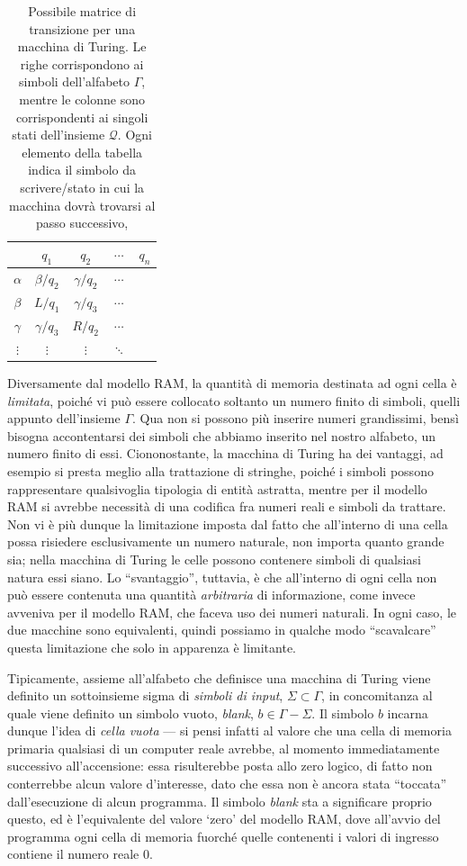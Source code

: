 \documentclass[10pt]{\classname}
\begin{document}
\begin{table}[ht]
\centering
\begin{tabular}{c|cccc}
    & $q_1$ & $q_2$ & $\cdots$ & $q_n$ \\
    \hline
$\alpha$ & $\beta/q_2$ & $\gamma/q_2$ & $\cdots$ & \\
$\beta$ & $L/q_1$ & $\gamma/q_3$ & $\cdots$ & \\
$\gamma$ & $\gamma/q_3$ & $R/q_2$ & $\cdots$ & \\
$\vdots$ & $\vdots$ & $\vdots$ & $\ddots$ &    
\end{tabular}
\caption{Possibile matrice di transizione per una macchina di Turing. Le righe
corrispondono ai simboli dell'alfabeto $\Gamma$, mentre le colonne sono
corrispondenti ai singoli stati dell'insieme $\mathcal
Q$. Ogni elemento della tabella indica il simbolo da scrivere/stato in cui la
macchina dovrà trovarsi al passo successivo,}\label{tab:matriceTransizione}
\end{table}
\bigskip


Diversamente dal modello RAM, la quantità di memoria destinata ad ogni cella è
\emph{limitata}, poiché vi può essere collocato soltanto un numero finito di
simboli, quelli appunto dell'insieme $\Gamma$. Qua non si possono più inserire
numeri grandissimi, bensì bisogna accontentarsi dei simboli che abbiamo inserito
nel nostro alfabeto, un numero finito di essi. Ciononostante, la macchina di
Turing ha dei vantaggi, ad esempio si presta meglio alla trattazione di
stringhe, poiché i simboli possono rappresentare qualsivoglia tipologia di
entità astratta, mentre per il modello RAM si avrebbe necessità di una codifica
fra numeri reali e simboli da trattare. Non vi è più dunque la limitazione
imposta dal fatto che all'interno di una cella possa risiedere esclusivamente
un numero naturale, non importa quanto grande sia; nella macchina di Turing le
celle possono contenere simboli di qualsiasi natura essi siano. Lo
``svantaggio'', tuttavia, è che all'interno di ogni cella non può essere
contenuta una quantità \emph{arbitraria} di informazione, come invece avveniva
per il modello RAM, che faceva uso dei numeri naturali. In ogni caso, le due
macchine sono equivalenti, quindi possiamo in qualche modo ``scavalcare''
questa limitazione che solo in apparenza è limitante.

Tipicamente, assieme all'alfabeto che definisce una macchina di Turing viene definito
un sottoinsieme sigma di \emph{simboli di input}, $\Sigma \subset \Gamma$, in
concomitanza al quale viene definito un simbolo vuoto, \emph{blank}, $b \in
\Gamma - \Sigma$. Il simbolo $b$ incarna dunque l'idea di \emph{cella
vuota} --- si pensi infatti al valore che una cella di memoria primaria
qualsiasi di un computer reale avrebbe, al momento immediatamente successivo
all'accensione: essa risulterebbe posta allo zero logico, di fatto non
conterrebbe alcun valore d'interesse, dato che essa non è ancora stata
``toccata'' dall'esecuzione di alcun programma. Il simbolo \emph{blank} sta a
significare proprio questo, ed è l'equivalente del valore `zero' del modello
RAM, dove all'avvio del programma ogni cella di memoria fuorché quelle
contenenti i valori di ingresso contiene il numero reale $0$. 
\end{document}
